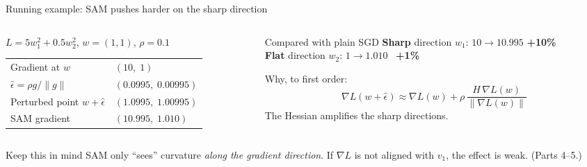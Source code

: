 \documentclass[aspectratio=169,10pt]{beamer}
\newcommand{\norm}[1]{\lVert #1\rVert}
\newcommand{\sh}[1]{\textcolor{sharp}{#1}}
\newcommand{\fl}[1]{\textcolor{flat}{#1}}
\newcommand{\mt}[1]{\textcolor{muted}{#1}}
\begin{document}
\begin{frame}{Running example: SAM pushes harder on the sharp direction}
\begin{columns}[T]
\begin{column}{0.5\textwidth}
$L=5w_1^2+0.5w_2^2$, \; $w=(1,1)$, \; $\rho=0.1$\\[6pt]
\renewcommand{\arraystretch}{1.25}
\begin{tabular}{@{}ll@{}}
\toprule
Gradient at $w$ & $(10,\;1)$ \\
$\hat\epsilon=\rho g/\norm{g}$ & $(0.0995,\;0.00995)$ \\
Perturbed point $w+\hat\epsilon$ & $(1.0995,\;1.00995)$ \\
SAM gradient & $(10.995,\;1.010)$ \\
\bottomrule
\end{tabular}
\end{column}
\begin{column}{0.48\textwidth}
\begin{block}{Compared with plain SGD}
\sh{\textbf{Sharp} direction $w_1$}: $10 \to 10.995$ \quad \sh{\textbf{+10\%}}\\[3pt]
\fl{\textbf{Flat} direction $w_2$}: \;$1 \to 1.010$ \quad\;\, \fl{\textbf{+1\%}}
\end{block}
\vspace{0.3em}
Why, to first order:
\[ \nabla L(w+\hat\epsilon) \approx \nabla L(w) + \rho\,\frac{H\,\nabla L(w)}{\norm{\nabla L(w)}} \]
\mt{\small The Hessian amplifies the sharp directions.}
\end{column}
\end{columns}
\vspace{0.6em}
\begin{alertblock}{Keep this in mind}
SAM only ``sees'' curvature \emph{along the gradient direction}. If $\nabla L$ is not aligned with $v_1$, the effect is weak. \mt{(Parts 4--5.)}
\end{alertblock}
\end{frame}
\end{document}
